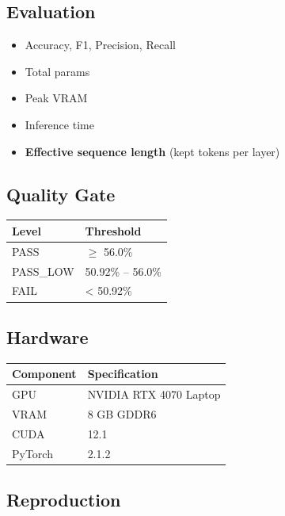 \subsection{Evaluation}

\begin{itemize}
\item Accuracy, F1, Precision, Recall
\item Total params
\item Peak VRAM
\item Inference time
\item \textbf{Effective sequence length} (kept tokens per layer)

\end{itemize}
\subsection{Quality Gate}

\begin{table}[H]
\centering
\small
\begin{tabular}{ll}
\toprule
\textbf{Level} & \textbf{Threshold} \\
\midrule
PASS & $\ge$ 56.0\% \\
PASS\_LOW & 50.92\% -- 56.0\% \\
FAIL & \textless{} 50.92\% \\
\bottomrule
\end{tabular}
\end{table}

\subsection{Hardware}

\begin{table}[H]
\centering
\small
\begin{tabular}{ll}
\toprule
\textbf{Component} & \textbf{Specification} \\
\midrule
GPU & NVIDIA RTX 4070 Laptop \\
VRAM & 8 GB GDDR6 \\
CUDA & 12.1 \\
PyTorch & 2.1.2 \\
\bottomrule
\end{tabular}
\end{table}

\subsection{Reproduction}

